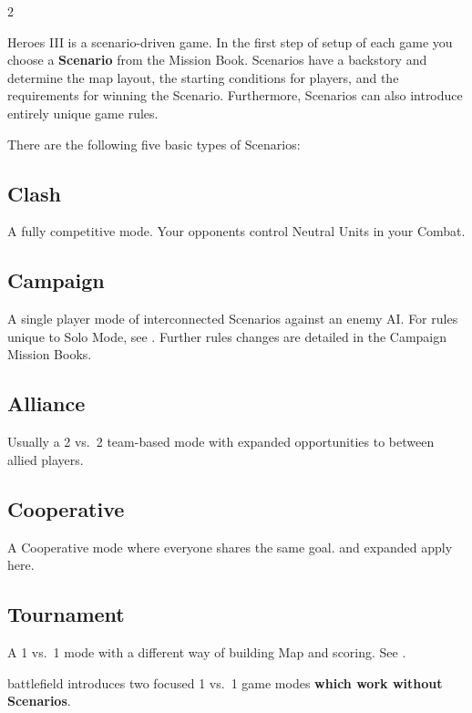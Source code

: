 
\begin{multicols*}{2}

Heroes III is a scenario-driven game. In the first step of setup of each game you choose a \textbf{Scenario} from the Mission Book. Scenarios have a backstory and determine the map layout, the starting conditions for players, and the requirements for winning the Scenario. Furthermore, Scenarios can also introduce entirely unique game rules.


There are the following five basic types of Scenarios:

\subsection*{Clash}
A fully competitive mode.
Your opponents control Neutral Units in your Combat.

\subsection*{Campaign}
A single player mode of interconnected Scenarios against an enemy AI.
For rules unique to Solo Mode, see .
Further rules changes are detailed in the Campaign Mission Books.

\subsection*{Alliance}
Usually a 2 vs.~2 team-based mode with expanded opportunities to  between allied players.

\subsection*{Cooperative}
A Cooperative mode where everyone shares the same goal.  and expanded  apply here.

\subsection*{Tournament}
A 1 vs.~1 mode with a different way of building Map and scoring. See .

\bigskip
\begin{expansion}[before=\vspace*{-10mm}]{battlefield}
   introduces two focused 1 vs.~1 game modes \textbf{which work without Scenarios}.


\end{expansion}
\end{multicols*}
